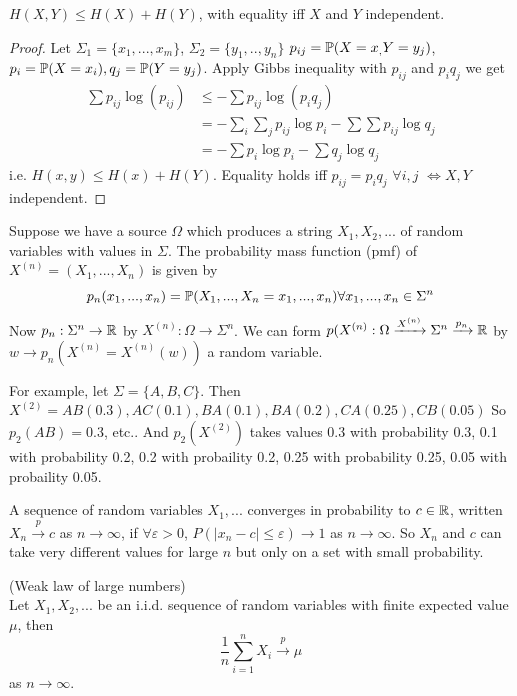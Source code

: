 \documentclass[a4paper]{article}
\begin{document}
\begin{lemma}
$H(X,Y) \leq H(X) + H(Y)$, with equality iff $X$ and $Y$ independent.
\begin{proof}
Let $\Sigma_1 = \{x_1,...,x_m\}$, $\Sigma_2 = \{y_1,..,y_n\}$ $p_{ij} = \P(X=x_,Y=y_j)$, $p_i = \P(X=x_i), q_j = \P(Y=y_j)$. Apply Gibbs inequality with $p_{ij}$ and $p_i q_j$ we get
\begin{equation*}
\begin{aligned}
\sum p_{ij} \log (p_{ij}) & \leq -\sum p_{ij} \log (p_i q_j)\\
&= -\sum_i \sum_j p_{ij} \log p_i - \sum\sum p_{ij} \log q_j\\
&= -\sum p_i \log p_i - \sum q_j \log q_j
\end{aligned}
\end{equation*}
i.e. $H(x,y) \leq H(x) + H(Y)$. Equality holds iff $p_{ij} = p_i q_j$ $\forall i,j$ $\iff X,Y$ independent.
\end{proof}
\end{lemma}

Suppose we have a source $\Omega$ which produces a string $X_1,X_2,...$ of random variables with values in $\Sigma$. The probability mass function (pmf) of $X^{(n)} = (X_1,...,X_n)$ is given by $$p_n(x_1,...,x_n) = \P(X_1,...,X_n = x_1,...,x_n) \forall x_1,...,x_n \in \Sigma^n$$
Now $p_n: \Sigma^n \to \R$ by $X^{(n)}: \Omega \to \Sigma^n$. We can form $p(X^{(n)}: \Omega \xrightarrow{X^{(n)}} \Sigma^n \xrightarrow{p_n} \R$ by $w \to p_n(X^{(n)} = X^{(n)} (w))$ a random variable.

For example, let $\Sigma = \{A,B,C\}$. Then $X^{(2)} = AB (0.3), AC(0.1), BA(0.1), BA (0.2), CA(0.25), CB(0.05)$ So $p_2(AB)= 0.3$, etc.. And $p_2(X^{(2)})$ takes values $0.3$ with probability 0.3, 0.1 with probability 0.2, 0.2 with probaility 0.2, 0.25 with probability 0.25, 0.05 with probaility 0.05.

\begin{defi}
A sequence of random variables $X_1,...$ converges in probability to $c \in \R$, written $X_n \xrightarrow{p} c$ as $n \to \infty$, if $\forall \varepsilon >0$, $P(|x_n-c| \leq \varepsilon) \to 1$ as $n \to \infty$. So $X_n$ and $c$ can take very different values for large $n$ but only on a set with small probability.
\end{defi}

\begin{thm} (Weak law of large numbers)\\
Let $X_1,X_2,...$ be an i.i.d. sequence of random variables with finite expected value $\mu$, then $$\frac{1}{n} \sum_{i=1}^n X_i \xrightarrow{p} \mu$$
as $n \to \infty$.
\end{thm}
\end{document}
